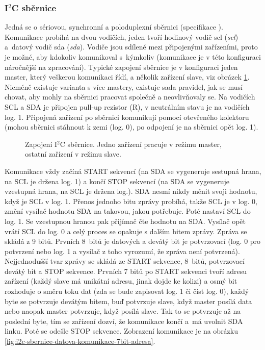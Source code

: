 \subsubsection{I$^2$C sběrnice}
Jedná se o sériovou, synchronní a poloduplexní sběrnici (specifikace \cite{i2c-sbernice-specifikace}). Komunikace probíhá na dvou vodičích, jeden tvoří hodinový vodič \acrshort{scl} (\textit{\acrlong{scl}}) a~datový vodič \acrshort{sda} (\textit{\acrlong{sda}}). Vodiče jsou sdílené mezi připojenými zařízeními, proto je možné, aby kdokoliv komunikoval s~kýmkoliv (komunikace je v této konfiguraci náročnější na zpracování). Typické zapojení sběrnice je v konfiguraci jeden master, který veškerou komunikaci řídí, a několik zařízení slave, viz obrázek \ref{fig:i2c-sbernice}. Nicméně existuje varianta s více mastery, existuje sada pravidel, jak se musí chovat, aby mohly na sběrnici pracovat společně a neovlivňovaly se. Na vodičích SCL a SDA je připojen pull-up rezistor (R), v neutrálním stavu je na vodičích log. 1. Připojená zařízení po sběrnici komunikují pomocí otevřeného kolektoru (mohou sběrnici stáhnout k zemi (log. 0), po odpojení je na sběrnici opět log. 1). \cite{dudka-i2c-relativene-jednoduse}

\begin{figure}[H]
    \centering
    \def\svgwidth{\columnwidth}
    
    \caption[Zapojení I$^2$C sběrnice.]{Zapojení I$^2$C sběrnice. Jedno zařízení pracuje v režimu master, ostatní zařízení v režimu slave.}
    \label{fig:i2c-sbernice}
\end{figure}

Komunikace vždy začíná START sekvencí (na SDA se vygeneruje sestupná hrana, na SCL je držena log. 1) a končí STOP sekvencí (na SDA se vygeneruje vzestupná hrana, na SCL je držena log.). SDA nesmí nikdy měnit svoji hodnotu, když je SCL v log. 1.  Přenos jednoho bitu zprávy probíhá, takže SCL je v log. 0, změní vysílač hodnotu SDA na takovou, jakou potřebuje. Poté nastaví SCL do log. 1. Se vzestupnou hranou pak přijímač čte hodnotu na SDA. Vysílač opět vrátí SCL do log. 0 a celý proces se opakuje s dalším bitem zprávy. Zpráva se skládá z 9 bitů. Prvních 8~bitů je datových a devátý bit je potvrzovací (log. 0 pro potvrzení nebo log. 1 a vysílač z toho vyrozumí, že zpráva není potvrzená). Nejjednodušší tvar zprávy se skládá ze START sekvence, 8~bitů, potvrzovací devátý bit a STOP sekvence. Prvních 7 bitů po START sekvenci tvoří adresu zařízení (každý slave má unikátní adresu, jinak dojde ke kolizi) a osmý bit rozhoduje o směru toku dat (zda se bude zapisovat log. 1 či číst log. 0), každý byte se potvrzuje devátým bitem, buď potvrzuje slave, když master posílá data nebo naopak master potvrzuje, když posílá slave. Tak to se potvrzuje až na poslední byte, tím se zařízení dozví, že komunikace končí a~má uvolnit SDA linku. Poté se odešle STOP sekvence. Zobrazení komunikace je na obrázku \ref{fig:i2c-sbernice-datova-komunikace-7bit-adresa}. \cite{dudka-i2c-relativene-jednoduse} \cite{olejar-strucny-popis-sbernice-i2c}

